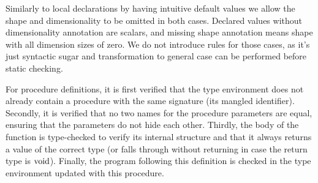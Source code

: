 \documentclass[a4paper, 10pt, draft]{report}
\newcommand{\mycode}[1]{\ensuremath{\mbox{\lstinline{#1}}}}
\begin{document}
Similarly to local declarations by having intuitive default values we allow the
shape and dimensionality to be omitted in both cases. Declared values without
dimensionality annotation are scalars, and missing shape annotation means shape
with all dimension sizes of zero. We do not introduce rules for those cases, as
it's just syntactic sugar and transformation to general case can be performed
before static checking.

For procedure definitions, it is first verified that the type environment does
not already contain a procedure with the same signature (its mangled
identifier). Secondly, it is verified that no two names for the procedure
parameters are equal, ensuring that the parameters do not hide each other.
Thirdly, the body of the function is type-checked to verify its internal
structure and that it always returns a value of the correct type (or falls
through without returning in case the return type is \mycode{void}).  Finally,
the program following this definition is checked in the type environment
updated with this procedure.
\end{document}
